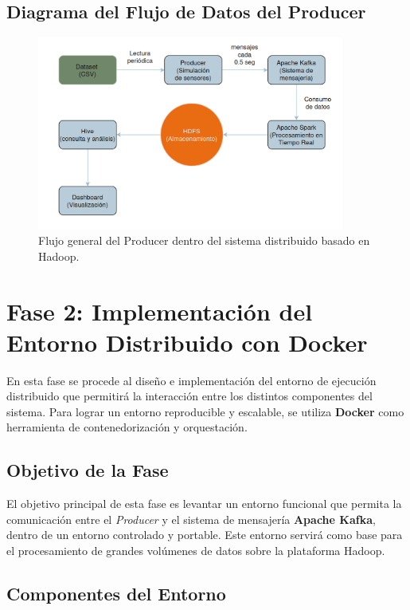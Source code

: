 \documentclass[12pt,a4paper]{article}
\begin{document}
\subsection{Diagrama del Flujo de Datos del Producer}

\begin{figure}[H]
    \centering
    \includegraphics[width=0.9\textwidth]{diagram.png}
    \caption{Flujo general del Producer dentro del sistema distribuido basado en Hadoop.}
\end{figure}

\section{Fase 2: Implementación del Entorno Distribuido con Docker}

En esta fase se procede al diseño e implementación del entorno de ejecución distribuido que permitirá la interacción entre los distintos componentes del sistema. Para lograr un entorno reproducible y escalable, se utiliza \textbf{Docker} como herramienta de contenedorización y orquestación.

\subsection{Objetivo de la Fase}
El objetivo principal de esta fase es levantar un entorno funcional que permita la comunicación entre el \textit{Producer} y el sistema de mensajería \textbf{Apache Kafka}, dentro de un entorno controlado y portable. Este entorno servirá como base para el procesamiento de grandes volúmenes de datos sobre la plataforma Hadoop.

\subsection{Componentes del Entorno}
\end{document}
